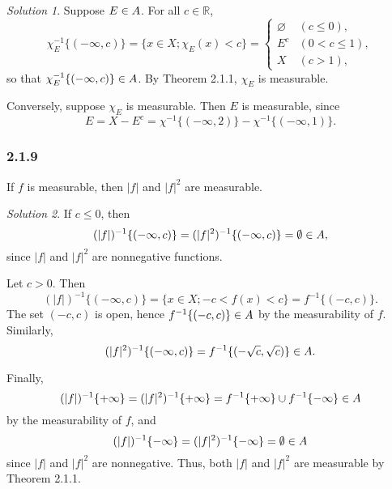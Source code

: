 \documentclass{report}
\newcommand{\bb}[1]{\mathbb{#1}}
\let\cal\relax
\newcommand{\cal}[1]{\mathcal{#1}}
\theoremstyle{remark}
\newtheorem*{solution}{Solution}
\begin{document}
\begin{solution}
  Suppose $E \in \cal A$. For all $c \in \bb R$,
  \begin{equation*}
    \chi_E^{-1}\{(-\infty, c)\} = \{x \in X; \chi_E(x) < c\} =
    \begin{cases}
      \varnothing & (c \le 0), \\
      E^c & (0 < c \le 1), \\
      X & (c > 1),
    \end{cases}
  \end{equation*}
  so that $\chi_E^{-1}\{(-\infty, c)\} \in \cal A$. By Theorem 2.1.1, $\chi_E$ is measurable.

  Conversely, suppose $\chi_E$ is measurable. Then $E$ is measurable, since
  \begin{equation*}
    E = X - E^c = \chi^{-1}\{(-\infty, 2)\} - \chi^{-1}\{(-\infty, 1)\}.
  \end{equation*}
\end{solution}

\subsubsection*{2.1.9}
If $f$ is measurable, then $|f|$ and $|f|^2$ are measurable.

\begin{solution}
  If $c \le 0$, then
  \begin{equation*}
    (|f|)^{-1}\{(-\infty, c)\} = (|f|^2)^{-1}\{(-\infty, c)\} = \emptyset \in \cal A,
  \end{equation*}
  since $|f|$ and $|f|^2$ are nonnegative functions.
  
  Let $c > 0$. Then
  \begin{equation*}
    (|f|)^{-1}\{(-\infty, c)\} = \{x \in X; -c < f(x) < c\} = f^{-1}\{(-c,c)\}.
  \end{equation*}
  The set $(-c,c)$ is open, hence $f^{-1}\{(-c,c)\} \in \cal A$ by the measurability of $f$. Similarly,
  \begin{equation*}
    (|f|^2)^{-1}\{(-\infty, c)\} = f^{-1}\{(-\sqrt c, \sqrt c)\} \in \cal A.
  \end{equation*}

  Finally,
  \begin{equation*}
    (|f|)^{-1}\{+\infty\} = (|f|^2)^{-1}\{+\infty\} = f^{-1}\{+\infty\} \cup f^{-1}\{-\infty\} \in \cal A
  \end{equation*}
  by the measurability of $f$, and
  \begin{equation*}
    (|f|)^{-1}\{-\infty\} = (|f|^2)^{-1}\{-\infty\} = \emptyset \in \cal A
  \end{equation*}
  since $|f|$ and $|f|^2$ are nonnegative. Thus, both $|f|$ and $|f|^2$ are measurable by Theorem 2.1.1.
\end{solution}
\end{document}
